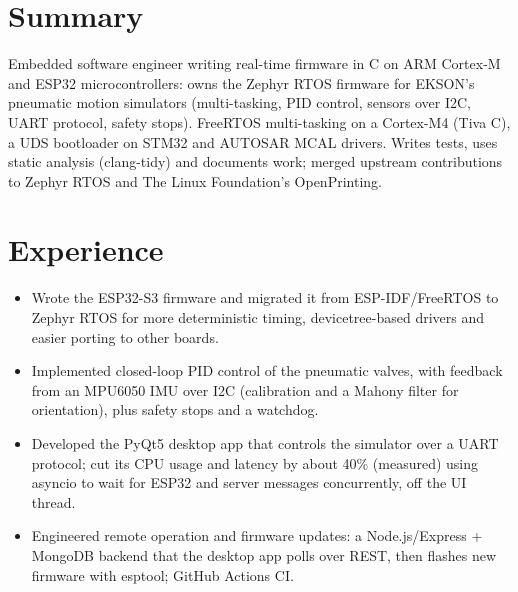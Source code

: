 \documentclass[10pt]{article}
\begin{document}

\section*{Summary}
Embedded software engineer writing real-time firmware in C on ARM Cortex-M and ESP32 microcontrollers: owns the Zephyr RTOS firmware for EKSON's pneumatic motion simulators (multi-tasking, PID control, sensors over I2C, UART protocol, safety stops). FreeRTOS multi-tasking on a Cortex-M4 (Tiva C), a UDS bootloader on STM32 and AUTOSAR MCAL drivers. Writes tests, uses static analysis (clang-tidy) and documents work; merged upstream contributions to Zephyr RTOS and The Linux Foundation's OpenPrinting.

\section*{Experience}
\begin{itemize}
  \item Wrote the ESP32-S3 firmware and migrated it from ESP-IDF/FreeRTOS to Zephyr RTOS for more deterministic timing, devicetree-based drivers and easier porting to other boards.
  \item Implemented closed-loop PID control of the pneumatic valves, with feedback from an MPU6050 IMU over I2C (calibration and a Mahony filter for orientation), plus safety stops and a watchdog.
  \item Developed the PyQt5 desktop app that controls the simulator over a UART protocol; cut its CPU usage and latency by about 40\% (measured) using asyncio to wait for ESP32 and server messages concurrently, off the UI thread.
  \item Engineered remote operation and firmware updates: a Node.js/Express + MongoDB backend that the desktop app polls over REST, then flashes new firmware with esptool; GitHub Actions CI.
\end{itemize}
\end{document}
